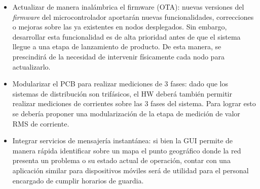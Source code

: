 \begin{itemize}
	\item Actualizar de manera inalámbrica el firmware (OTA): nuevas versiones del \textit{firmware} del microcontrolador aportarán nuevas funcionalidades, correcciones o mejoras sobre las ya existentes en nodos desplegados. Sin embargo, desarrollar esta funcionalidad es de alta prioridad antes de que el sistema llegue a una etapa de lanzamiento de producto. De esta manera, se prescindirá de la necesidad de intervenir físicamente cada nodo para actualizarlo.\\
	\item Modularizar el PCB para realizar mediciones de 3 fases: dado que los sistemas de distribución son trifásicos, el HW deberá también permitir realizar mediciones de corrientes sobre las 3 fases del sistema. Para lograr esto se debería proponer una modularización de la etapa de medición de valor RMS de corriente.\\
	\item Integrar servicios de mensajería instantánea: si bien la GUI permite de manera rápida identificar sobre un mapa el punto geográfico donde la red presenta un problema o su estado actual de operación, contar con una aplicación similar para dispositivos móviles será de utilidad para el personal encargado de cumplir horarios de guardia.\\
	
\end{itemize}

